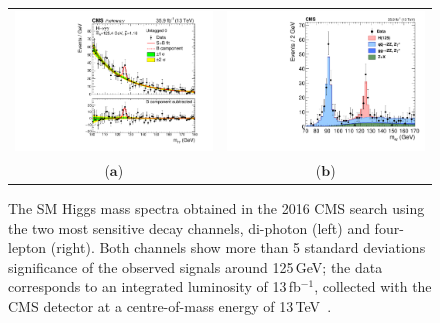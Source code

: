 \begin{figure}[htp]
\centering
\begin{tabular}{cc}
\hspace{-0.3cm}
\includegraphics[scale=0.35]{fig/sm_beyond/CMS-PAS-Htogamma.pdf}
& \hspace{-0.5cm} \includegraphics[scale=0.35]{fig/sm_beyond/CMS-PAS-Hto4l.pdf}\\
   ($\mathbf{a}$)\qquad&($\mathbf{b}$)\qquad\\
\end{tabular}
\caption{\label{fig:sm_higgs}The SM Higgs mass spectra obtained in the 2016 CMS search using the two most sensitive decay channels, di-photon (left) and four-lepton (right). Both channels show more than 5 standard deviations significance of the observed signals around 125\,GeV; the data corresponds to an integrated luminosity of 13\,fb$^{-1}$, collected with the CMS detector at a centre-of-mass energy of 13\,TeV~\cite{pub:sm_higgs4l,pub:sm_higgs2gamma}.}
\end{figure} 

